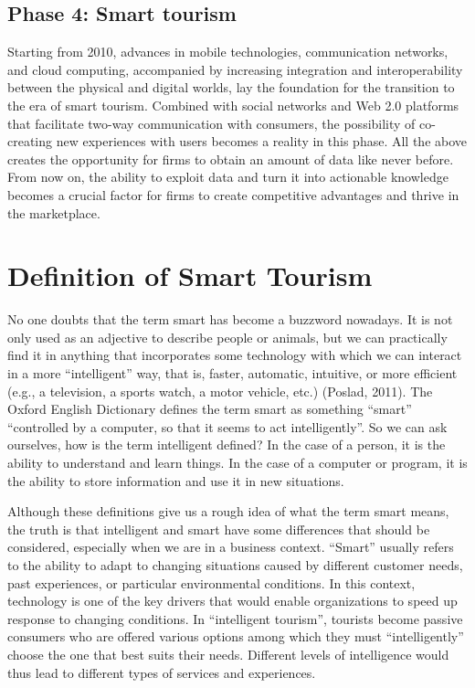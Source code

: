 \documentclass[
  letterpaper,
  DIV=11,
  numbers=noendperiod]{scrreprt}
\begin{document}
\hypertarget{phase-4-smart-tourism}{%
\subsection{Phase 4: Smart tourism}\label{phase-4-smart-tourism}}

Starting from 2010, advances in mobile technologies, communication
networks, and cloud computing, accompanied by increasing integration and
interoperability between the physical and digital worlds, lay the
foundation for the transition to the era of smart tourism. Combined with
social networks and Web 2.0 platforms that facilitate two-way
communication with consumers, the possibility of co-creating new
experiences with users becomes a reality in this phase. All the above
creates the opportunity for firms to obtain an amount of data like never
before. From now on, the ability to exploit data and turn it into
actionable knowledge becomes a crucial factor for firms to create
competitive advantages and thrive in the marketplace.

\hypertarget{definition-of-smart-tourism}{%
\section{Definition of Smart
Tourism}\label{definition-of-smart-tourism}}

No one doubts that the term smart has become a buzzword nowadays. It is
not only used as an adjective to describe people or animals, but we can
practically find it in anything that incorporates some technology with
which we can interact in a more ``intelligent'' way, that is, faster,
automatic, intuitive, or more efficient (e.g., a television, a sports
watch, a motor vehicle, etc.) (Poslad, 2011). The Oxford English
Dictionary defines the term smart as something ``smart'' ``controlled by
a computer, so that it seems to act intelligently''. So we can ask
ourselves, how is the term intelligent defined? In the case of a person,
it is the ability to understand and learn things. In the case of a
computer or program, it is the ability to store information and use it
in new situations.

Although these definitions give us a rough idea of what the term smart
means, the truth is that intelligent and smart have some differences
that should be considered, especially when we are in a business context.
``Smart'' usually refers to the ability to adapt to changing situations
caused by different customer needs, past experiences, or particular
environmental conditions. In this context, technology is one of the key
drivers that would enable organizations to speed up response to changing
conditions. In ``intelligent tourism'', tourists become passive
consumers who are offered various options among which they must
``intelligently'' choose the one that best suits their needs. Different
levels of intelligence would thus lead to different types of services
and experiences.
\end{document}
